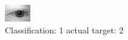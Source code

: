 \begin{figure}[h!]
\begin{center}
\includegraphics[width=0.60\columnwidth]{figures/ID408_class_1_target_2.png}
\end{center}
\caption{ Classification: 1 actual target: 2}
\label{fig:ID408_class_1_target_2}
\end{figure}
